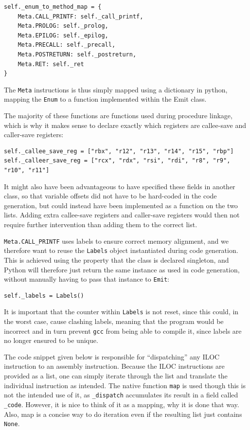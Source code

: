 \begin{verbatim}
self._enum_to_method_map = {
    Meta.CALL_PRINTF: self._call_printf,
    Meta.PROLOG: self._prolog,
    Meta.EPILOG: self._epilog,
    Meta.PRECALL: self._precall,
    Meta.POSTRETURN: self._postreturn,
    Meta.RET: self._ret
}
\end{verbatim}

The \texttt{Meta} instructions is thus simply mapped using a dictionary in python, mapping the \texttt{Enum} to a function implemented within the Emit class.

The majority of these functions are functions used during procedure linkage, which is why it makes sense to declare exactly which registers are callee-save and caller-save registers:

\begin{verbatim}
self._callee_save_reg = ["rbx", "r12", "r13", "r14", "r15", "rbp"]
self._calleer_save_reg = ["rcx", "rdx", "rsi", "rdi", "r8", "r9", "r10", "r11"]
\end{verbatim}

It might also have been advantageous to have specified these fields in another class, so that variable offsets did not have to be hard-coded in the code generation, but could instead have been implemented as a function on the two lists. Adding extra callee-save registers and caller-save registers would then not require further intervention than adding them to the correct list.

\texttt{Meta.CALL\_PRINTF} uses labels to ensure correct memory alignment, and we therefore want to reuse the \texttt{Labels} object instantiated during code generation. This is achieved using the property that the class is declared singleton, and Python will therefore just return the same instance as used in code generation, without manually having to pass that instance to \texttt{Emit}:

\begin{verbatim}
self._labels = Labels()
\end{verbatim}

It is important that the counter within \texttt{Labels} is not reset, since this could, in the worst case, cause clashing labels, meaning that the program would be incorrect and in turn prevent \texttt{gcc} from being able to compile it, since labels are no longer ensured to be unique.

The code snippet given below is responsible for ``dispatching'' any ILOC instruction to an assembly instruction. Because the ILOC instructions are provided as a list, one can simply iterate through the list and translate the individual instruction as intended. The native function \texttt{map} is used though this is not the intended use of it, as \texttt{\_dispatch} accumulates its result in a field called \texttt{\_code}. However, it is nice to think of it as a mapping, why it is done that way. Also, map is a concise way to do iteration even if the resulting list just contains \texttt{None}.

